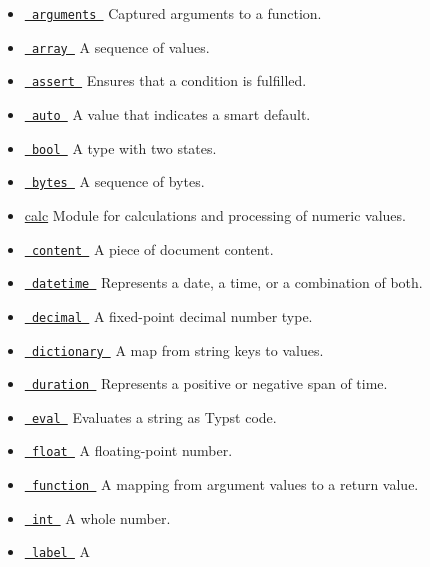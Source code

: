 \begin{itemize}
\tightlist
\item
  \href{/docs/reference/foundations/arguments/}{\texttt{\ arguments\ }}
  { Captured arguments to a function. }
\item
  \href{/docs/reference/foundations/array/}{\texttt{\ array\ }} { A
  sequence of values. }
\item
  \href{/docs/reference/foundations/assert/}{\texttt{\ assert\ }} {
  Ensures that a condition is fulfilled. }
\item
  \href{/docs/reference/foundations/auto/}{\texttt{\ auto\ }} { A value
  that indicates a smart default. }
\item
  \href{/docs/reference/foundations/bool/}{\texttt{\ bool\ }} { A type
  with two states. }
\item
  \href{/docs/reference/foundations/bytes/}{\texttt{\ bytes\ }} { A
  sequence of bytes. }
\item
  \href{/docs/reference/foundations/calc}{calc} { Module for
  calculations and processing of numeric values. }
\item
  \href{/docs/reference/foundations/content/}{\texttt{\ content\ }} { A
  piece of document content. }
\item
  \href{/docs/reference/foundations/datetime/}{\texttt{\ datetime\ }} {
  Represents a date, a time, or a combination of both. }
\item
  \href{/docs/reference/foundations/decimal/}{\texttt{\ decimal\ }} { A
  fixed-point decimal number type. }
\item
  \href{/docs/reference/foundations/dictionary/}{\texttt{\ dictionary\ }}
  { A map from string keys to values. }
\item
  \href{/docs/reference/foundations/duration/}{\texttt{\ duration\ }} {
  Represents a positive or negative span of time. }
\item
  \href{/docs/reference/foundations/eval/}{\texttt{\ eval\ }} {
  Evaluates a string as Typst code. }
\item
  \href{/docs/reference/foundations/float/}{\texttt{\ float\ }} { A
  floating-point number. }
\item
  \href{/docs/reference/foundations/function/}{\texttt{\ function\ }} {
  A mapping from argument values to a return value. }
\item
  \href{/docs/reference/foundations/int/}{\texttt{\ int\ }} { A whole
  number. }
\item
  \href{/docs/reference/foundations/label/}{\texttt{\ label\ }} { A
}
\end{itemize}
